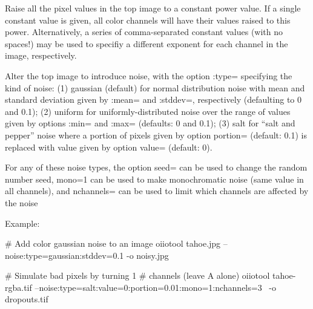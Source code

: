 Raise all the pixel values in the top image to a constant power value.
If a single constant value is given, all color channels will have their values
raised to this power.  Alternatively, a series of
comma-separated constant values (with no spaces!) may be used to specifiy a
different exponent for each channel in the image, respectively.
\apiend

Alter the top image to introduce noise, with the option {\cf :type=}
specifying the kind of noise: (1) {\cf gaussian} (default) for normal
distribution noise with mean and standard deviation given by {\cf :mean=}
and {\cf :stddev=}, respectively (defaulting to 0 and 0.1); (2) {\cf
uniform} for uniformly-distributed noise over the range of values given by
options {\cf :min=} and {\cf :max=} (defaults: 0 and 0.1); (3) {\cf salt}
for ``salt and pepper'' noise where a portion of pixels given by  option
{\cf portion=} (default: 0.1) is replaced with value given by option {\cf
value=} (default: 0).

For any of these noise types, the option {\cf seed=} can be used to change
the random number seed, {\cf mono=1} can be used to make monochromatic noise
(same value in all channels), and {\cf nchannels=} can be used to limit
which channels are affected by the noise

\noindent Example:
\begin{code}
    # Add color gaussian noise to an image
    oiiotool tahoe.jpg --noise:type=gaussian:stddev=0.1 -o noisy.jpg

    # Simulate bad pixels by turning 1%
    # channels (leave A alone)
    oiiotool tahoe-rgba.tif --noise:type=salt:value=0:portion=0.01:mono=1:nchannels=3 \
        -o dropouts.tif
\end{code}

